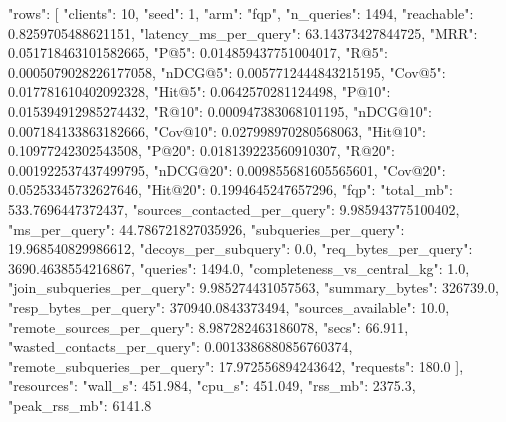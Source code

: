 {
 "rows": [
  {
   "clients": 10,
   "seed": 1,
   "arm": "fqp",
   "n_queries": 1494,
   "reachable": 0.8259705488621151,
   "latency_ms_per_query": 63.14373427844725,
   "MRR": 0.051718463101582665,
   "P@5": 0.014859437751004017,
   "R@5": 0.0005079028226177058,
   "nDCG@5": 0.0057712444843215195,
   "Cov@5": 0.017781610402092328,
   "Hit@5": 0.0642570281124498,
   "P@10": 0.015394912985274432,
   "R@10": 0.000947383068101195,
   "nDCG@10": 0.007184133863182666,
   "Cov@10": 0.027998970280568063,
   "Hit@10": 0.10977242302543508,
   "P@20": 0.018139223560910307,
   "R@20": 0.001922537437499795,
   "nDCG@20": 0.009855681605565601,
   "Cov@20": 0.05253345732627646,
   "Hit@20": 0.1994645247657296,
   "fqp": {
    "total_mb": 533.7696447372437,
    "sources_contacted_per_query": 9.985943775100402,
    "ms_per_query": 44.786721827035926,
    "subqueries_per_query": 19.968540829986612,
    "decoys_per_subquery": 0.0,
    "req_bytes_per_query": 3690.4638554216867,
    "queries": 1494.0,
    "completeness_vs_central_kg": 1.0,
    "join_subqueries_per_query": 9.985274431057563,
    "summary_bytes": 326739.0,
    "resp_bytes_per_query": 370940.0843373494,
    "sources_available": 10.0,
    "remote_sources_per_query": 8.987282463186078,
    "secs": 66.911,
    "wasted_contacts_per_query": 0.0013386880856760374,
    "remote_subqueries_per_query": 17.972556894243642,
    "requests": 180.0
   }
  }
 ],
 "resources": {
  "wall_s": 451.984,
  "cpu_s": 451.049,
  "rss_mb": 2375.3,
  "peak_rss_mb": 6141.8
 }
}